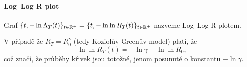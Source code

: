     \paragraph{Log--Log R plot}
    
    \begin{define}
        Graf $\lbrace t, -\ln\Lambda_{T}(t) \rbrace_{t\in \mathbb{R}^{+}} = \lbrace t, -\ln\ln R_{T}(t) \rbrace_{t\in \mathbb{R}^{+}}$ nazveme Log--Log R plotem. 
    \end{define}
    
    V případě že $R_T = R_0^{\gamma}$ (tedy Koziolův Greenův model) platí, že
    $$-\ln\ln R_{T}(t) = -\ln\gamma -  \ln\ln R_0,$$
    což značí, že průběhy křivek jsou totožné, jenom posunuté o konstantu $-\ln \gamma$.
